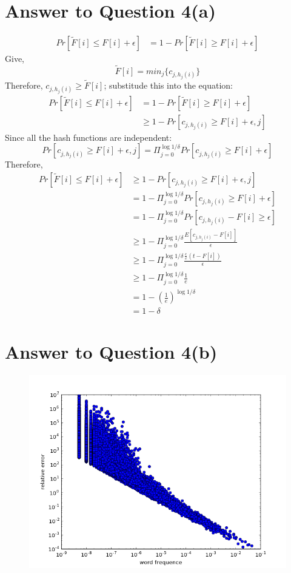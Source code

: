 \documentclass[11pt]{article}
\begin{document}
\section*{Answer to Question 4(a)}
$$
\begin{aligned}
Pr[\tilde{F}[i]\leq F[i] + \epsilon]
& = 1 - Pr[\tilde{F}[i] \geq F[i] + \epsilon]
\end{aligned}
$$
Give,
$$
\tilde{F}[i] = min_j\{c_{j,h_j(i)}\}
$$
Therefore, $c_{j,h_j(i)} \geq \tilde{F}[i]$; substitude this into the equation:
$$
\begin{aligned}
Pr[\tilde{F}[i]\leq F[i] + \epsilon]
& = 1 - Pr[\tilde{F}[i] \geq F[i] + \epsilon] \\
& \geq 1 - Pr[c_{j,h_j(i)} \geq F[i] + \epsilon, j]
\end{aligned}
$$
Since all the hash functions are independent:
$$
Pr[c_{j,h_j(i)} \geq F[i] + \epsilon, j] = \Pi_{j=0}^{\log{1/\delta}}Pr[c_{j,h_j(i)} \geq F[i] + \epsilon]
$$
Therefore,
$$
\begin{aligned}
Pr[\tilde{F}[i]\leq F[i] + \epsilon]
& \geq 1 - Pr[c_{j,h_j(i)} \geq F[i] + \epsilon, j]\\
& = 1 - \Pi_{j=0}^{\log{1/\delta}}Pr[c_{j,h_j(i)} \geq F[i] + \epsilon]\\
& = 1 - \Pi_{j=0}^{\log{1/\delta}}Pr[c_{j,h_j(i)} - F[i] \geq \epsilon]\\
& \geq 1 - \Pi_{j=0}^{\log{1/\delta}}\frac{E[c_{j,h_j(i)} - F[i]]}{\epsilon}\\
& \geq 1 - \Pi_{j=0}^{\log{1/\delta}}\frac{\frac{\epsilon}{e}(t-F[i])}{\epsilon}\\
& \geq 1 - \Pi_{j=0}^{\log{1/\delta}}\frac{1}{e}\\
& = 1 - (\frac{1}{e})^{\log{1/\delta}}\\
& = 1 - \delta
\end{aligned}
$$

\pagebreak[4]
\section*{Answer to Question 4(b)}
\begin{figure}[h]
\center
\includegraphics[scale=0.5]{streaming.png}
\end{figure}
\end{document}
